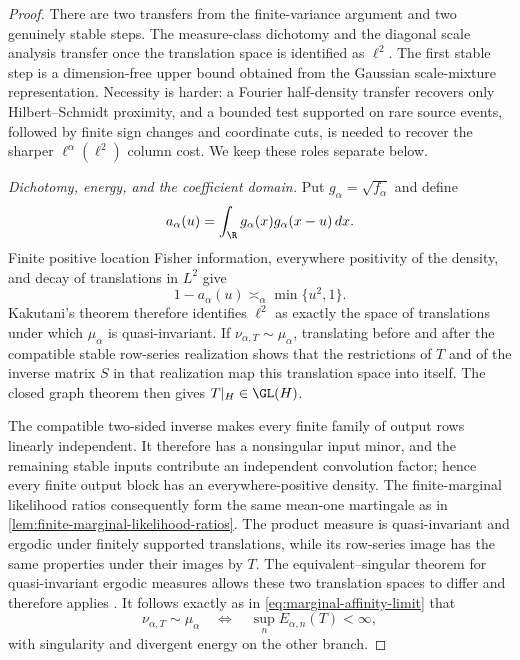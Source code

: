 \begin{proof}
There are two transfers from the finite-variance argument and two genuinely
stable steps.  The measure-class dichotomy and the diagonal scale analysis
transfer once the translation space is identified as \(\ell^2\).  The first
stable step is a dimension-free upper bound obtained from the Gaussian
scale-mixture representation.  Necessity is harder: a Fourier half-density
transfer recovers only Hilbert--Schmidt proximity, and a bounded test supported
on rare source events, followed by finite sign changes and coordinate cuts, is
needed to recover the sharper
\(\ell^\alpha(\ell^2)\) column cost.  We keep these roles separate below.

\emph{Dichotomy, energy, and the coefficient domain.}
Put \(g_\alpha=\sqrt{f_\alpha}\) and define
\[
 a_\alpha(u)=\int_\R g_\alpha(x)g_\alpha(x-u)\,dx.
\]
Finite positive location Fisher information, everywhere positivity of the
density, and decay of translations in \(L^2\) give
\begin{equation}
 1-a_\alpha(u)\asymp_\alpha\min\{u^2,1\}.
 \label{eq:stable-translation-affinity}
\end{equation}
Kakutani's theorem therefore identifies \(\ell^2\) as exactly the space of
translations under which \(\mu_\alpha\) is quasi-invariant.
If \(\nu_{\alpha,T}\sim\mu_\alpha\), translating before and after the
compatible stable row-series realization shows that the restrictions of \(T\)
and of the inverse matrix \(S\) in that realization map this translation space
into itself.
The closed graph theorem then gives \(T|_H\in\GL(H)\).

The compatible two-sided inverse makes every finite family of output rows
linearly independent.
It therefore has a nonsingular input minor, and the remaining stable inputs
contribute an independent convolution factor; hence every finite output
block has an everywhere-positive density.
The finite-marginal likelihood ratios consequently form the same mean-one
martingale as in
\cref{lem:finite-marginal-likelihood-ratios}.
The product measure is quasi-invariant and ergodic under finitely supported
translations, while its row-series image has the same properties under their
images by \(T\).
The equivalent--singular theorem for quasi-invariant ergodic measures allows
these two translation spaces to differ and therefore applies
\cite{okazaki1985dichotomy}.
It follows exactly as in \eqref{eq:marginal-affinity-limit} that
\begin{equation}
 \nu_{\alpha,T}\sim\mu_\alpha
 \quad\Longleftrightarrow\quad
 \sup_nE_{\alpha,n}(T)<\infty,
 \label{eq:stable-energy-dichotomy}
\end{equation}
with singularity and divergent energy on the other branch.


\end{proof}

